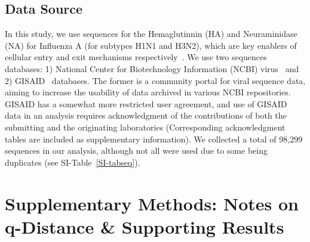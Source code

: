 \documentclass[onecolumn, compsoc,10pt]{IEEEtran}
\begin{document}
\subsection*{Data Source}

In this study, we use sequences for the Hemaglutinnin (HA)  and Neuraminidase (NA) for Influenza A (for subtypes H1N1 and H3N2), which are key enablers of cellular entry and exit mechanisms respectively~\cite{mcauley2019influenza}. We use two sequences databases: 1) National Center for Biotechnology Information (NCBI) virus~\cite{hatcher2017virus} and 2) GISAID~\cite{bogner2006global} databases. The former is a community portal for viral sequence data, aiming to increase the usability of data archived in various NCBI repositories. GISAID has a somewhat more restricted user agreement, and use of GISAID data in an analysis requires acknowledgment of the contributions of both the submitting and the originating laboratories (Corresponding acknowledgment tables are included as supplementary information). We collected a total of 98,299 sequences in our analysis, although not all were used due to some being duplicates (see SI-Table~\ref{SI-tabseq}).




% 
% 




\clearpage                                                                      
\setcounter{figure}{0}                                    \renewcommand{\figurename}{Extended Data Figure}                               
\setcounter{table}{0}                                     
\renewcommand{\tablename}{Extended Data Table}                                 



\clearpage                                                                                                   
\setcounter{figure}{0}
\renewcommand{\figurename}{SI Fig.}
\setcounter{table}{0}
\renewcommand{\tablename}{SI Tab.}







\section*{Supplementary Methods: Notes on q-Distance \& Supporting Results}
\end{document}
